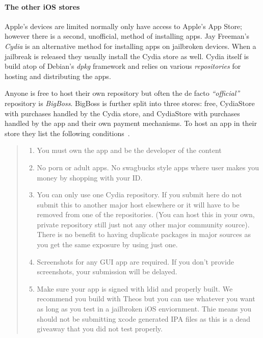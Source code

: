 \documentclass[thesis.tex]{subfiles}
\begin{document}
\paragraph{The other iOS stores}

Apple's devices are limited normally only have access to Apple's App Store; however there is a second, unofficial, method of installing apps.
Jay Freeman's \emph{Cydia} is an alternative method for installing apps on jailbroken devices.
When a jailbreak is released they usually install the Cydia store as well.
Cydia itself is build atop of Debian's \emph{dpkg} framework and relies on various \emph{repositories} for hosting and distributing the apps.

Anyone is free to host their own repository but often the de facto \emph{``official''} repository is \emph{BigBoss}.
BigBoss is further split into three stores: free, CydiaStore with purchases handled by the Cydia store, and CydiaStore with purchases handled by the app and their own payment mechanisms.  To host an app in their store they list the following conditions~\cite{bigboss_host_2014}.

\begin{quotation}
  \begin{enumerate}
    \item You must own the app and be the developer of the content

    \item No porn or adult apps. No swagbucks style apps where user makes you money by shopping with your ID.

    \item You can only use one Cydia repository. If you submit here do not submit this to another major host elsewhere or it will have to be removed from one of the repositories. (You can host this in your own, private repository still just not any other major community source). There is no benefit to having duplicate packages in major sources as you get the same exposure by using just one.

    \item Screenshots for any GUI app are required. If you don’t provide screenshots, your submission will be delayed.

    \item Make sure your app is signed with ldid and properly built. We recommend you build with Theos but you can use whatever you want as long as you test in a jailbroken iOS enviornment. Thie means you should not be submitting xcode generated IPA files as this is a dead giveaway that you did not test properly.
  \end{enumerate}
\end{quotation}
\end{document}
